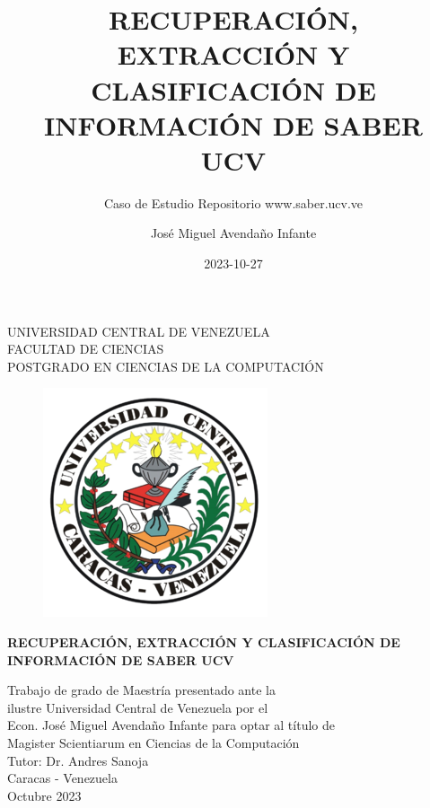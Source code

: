 \documentclass[
  10,
  openany]{book}
\title{RECUPERACIÓN, EXTRACCIÓN Y CLASIFICACIÓN DE INFORMACIÓN DE SABER UCV}
\subtitle{Caso de Estudio Repositorio www.saber.ucv.ve}
\author{José Miguel Avendaño Infante}
\date{2023-10-27}
\begin{document}
\maketitle

\thispagestyle{empty}
\begin{center}
	UNIVERSIDAD CENTRAL DE VENEZUELA\\
	FACULTAD DE CIENCIAS\\
	POSTGRADO EN CIENCIAS DE LA COMPUTACI\'ON\\

	\begin{figure}
						\centering
						  \includegraphics[height=.7\textwidth]{images/UCV.png}
  \end{figure}
  \vspace{1.5cm}
  \large{\textbf{RECUPERACI\'ON, EXTRACCI\'ON Y CLASIFICACI\'ON DE \\ INFORMACI\'ON DE SABER UCV}}

  \vspace{3cm}
  Trabajo de grado de Maestría presentado ante la \\
  ilustre Universidad Central de Venezuela por el\\
  Econ. José Miguel Avendaño Infante para  optar
  al título de \\Magister Scientiarum en Ciencias de la Computaci\'on\\
  \vspace{0.5cm}
  Tutor: Dr. Andres Sanoja\\
  \vspace{1.5cm}
  Caracas - Venezuela\\
  Octubre 2023
\end{center}
\end{document}

